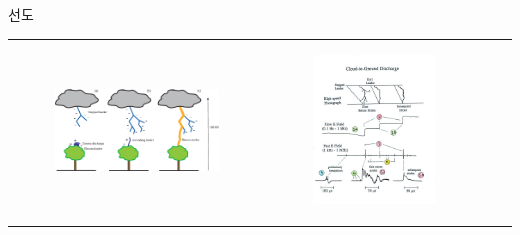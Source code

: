 \begin{frame}[t]{선도}
	\begin{tabular}{ll}
		\begin{minipage}[t]{0.475\textwidth}\scriptsize
			\begin{figure}[t]
				\includegraphics[width=\textwidth]{./images/Mechanism-of-lightning-initiation-a-stepped-leader-formation-b-initiation-of-an.png}
			\end{figure}
		\end{minipage}	
		&
		\begin{minipage}[t]{0.475\textwidth} \scriptsize	
			\begin{figure}[t]
				\includegraphics[width=0.8\textwidth]{./images/CG_photo_fields_01.jpg}
			\end{figure}

\end{minipage}
\end{tabular}
\end{frame}
